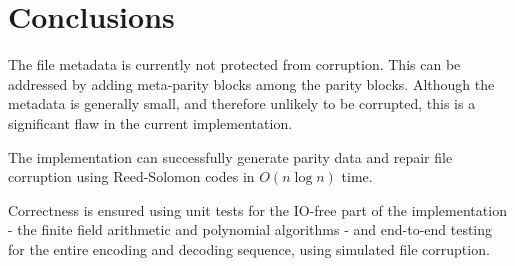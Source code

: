 \chapter{Conclusions}

The file metadata is currently not protected from corruption.
This can be addressed by adding meta-parity blocks among the parity blocks.
Although the metadata is generally small, and therefore unlikely to be corrupted, this is a significant flaw in the current implementation.

The implementation can successfully generate parity data and repair file corruption using Reed-Solomon codes in $O(n \log n)$ time.

Correctness is ensured using unit tests for the IO-free part of the implementation - the finite field arithmetic and polynomial algorithms - and end-to-end testing for the entire encoding and decoding sequence, using simulated file corruption.

